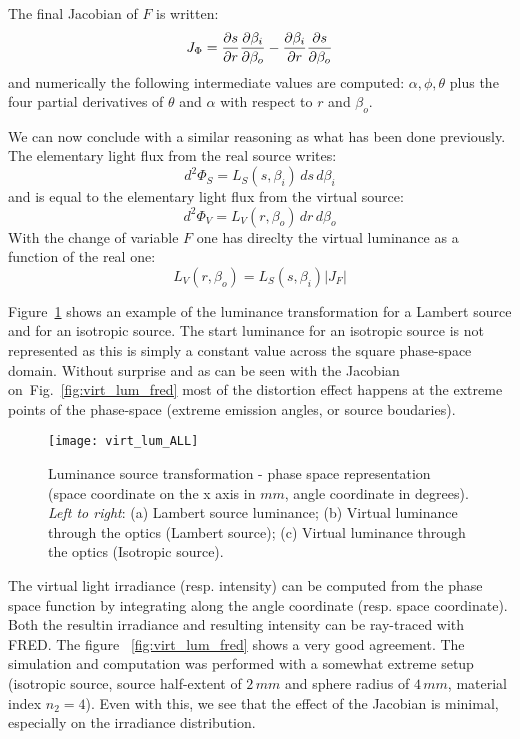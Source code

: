 The final Jacobian of $F$ is written:
\begin{equation}
J_\Phi = \frac{\partial{s}}{\partial{r}}\frac{\partial{\beta_i}}{\partial{\beta_o}} - \frac{\partial{\beta_i}}{\partial{r}}\frac{\partial{s}}{\partial{\beta_o}}
\end{equation}
and numerically the following intermediate values are computed: $\alpha, \phi, \theta $
 plus the four partial
derivatives of $\theta$ and $\alpha$ with respect to $r$ and $\beta_o$.

We can now conclude with a similar reasoning as what has been done previously. The 
elementary light flux from the real source writes:
\[d^2\Phi_S = L_S(s, \beta_i)\,ds\,d\beta_i\] 
and is equal to the elementary light flux from the virtual source:
\[ d^2\Phi_V = L_V(r, \beta_o)\,dr\,d\beta_o\]
With the change of variable $F$ one has direclty the virtual luminance as a function
of the real one:
\begin{equation}
L_V(r, \beta_o) = L_S(s, \beta_i) |J_F|
\end{equation}

Figure~\ref{fig:virt_lum_all} shows an example of the luminance transformation for a 
Lambert source and for an isotropic source.
The start luminance for an isotropic source is not represented as this is simply
a constant value across the square phase-space domain.
Without surprise and as can be seen with the Jacobian on~Fig.~\ref{fig:virt_lum_fred}
most of the distortion effect happens at the extreme points of the phase-space (extreme
emission angles, or source boudaries).

\begin{figure}[!htbp]
\centering
\texttt{[image: virt\_lum\_ALL]} 
\caption{Luminance source transformation - phase space representation (space coordinate
on the x axis in $mm$, angle coordinate in degrees). \textit{Left to right}: 
(a) Lambert source luminance; (b) Virtual luminance through the optics (Lambert source);
(c) Virtual luminance through the optics (Isotropic source).}
\label{fig:virt_lum_all}
\end{figure}

The virtual light irradiance (resp. intensity) can be computed from the phase space
function by integrating along the angle coordinate (resp. space coordinate). Both the
resultin irradiance and resulting intensity can be ray-traced with FRED. The figure~
\ref{fig:virt_lum_fred} shows a very good agreement. 
The simulation and computation was performed with a somewhat extreme setup (isotropic
source, source half-extent of $2\,mm$ and sphere radius of $4\,mm$, material index
$n_2 = 4$). Even with this, we see that the effect of the Jacobian is minimal, especially
on the irradiance distribution.

